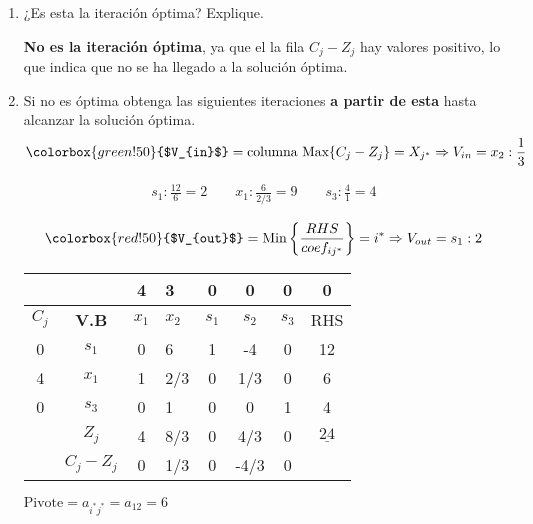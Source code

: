 \documentclass{templateNote}
\begin{document}
\begin{enumerate}
    \renewcommand{\labelenumi}{\alph{enumi})}
    \item ¿Es esta la iteraci\'on \'optima? Explique.
    
    \textbf{No es la iteraci\'on \'optima}, ya que el la fila $C_j - Z_j$ hay valores positivo, lo que indica que no se ha llegado a la soluci\'on \'optima.
    
    \item Si no es \'optima obtenga las siguientes iteraciones \textbf{a partir de esta} hasta alcanzar la soluci\'on \'optima.
    \begin{equation*}
        \colorbox{green!50}{$V_{in}$} = \text{columna Max} \{C_j-Z_j\} = X_{j^*} \Rightarrow V_{in} = x_2 : \frac{1}{3}
    \end{equation*}

    \begin{align*}
        s_1: \frac{12}{6} = 2 \qquad x_1: \frac{6}{2/3} = 9 \qquad s_3: \frac{4}{1} = 4 \\
    \end{align*}
    \begin{equation*}
        \colorbox{red!50}{$V_{out}$} = \text{Min} \left\{ \frac{RHS}{coef_{ij^*}} \right\} = i^* \Rightarrow V_{out} = s_1 : 2
    \end{equation*}

    \begin{center}
        \begin{tabular}{|c|c|c|g|c|c|c|c|}
            \hline
            & & 4 & 3 & 0 & 0 & 0 & 0 \\ \hline
            $C_j$ & \textbf{V.B} & $x_1$ & $x_2$ & $s_1$ & $s_2$ & $s_3$ & RHS \\ \hline
            0 & $s_1$ & 0 & 6 & 1 & -4 & 0 & 12 \\
            4 & $x_1$ & 1 & 2/3 & 0 & 1/3 & 0 & 6 \\
            0 & $s_3$ & 0 & 1 & 0 & 0 & 1 & 4 \\ \hline
            & $Z_j$ & 4 & 8/3 & 0 & 4/3 & 0 & $\underline{24}$ \\ \hline
            & $C_j - Z_j$ & 0 & 1/3 & 0 & -4/3 & 0 & \\ \hline
        \end{tabular}
    \end{center}
    \begin{center}
        $\text{Pivote} = a_{i^*j^*} = a_{12} = 6$
    \end{center}


\end{enumerate}
\end{document}
